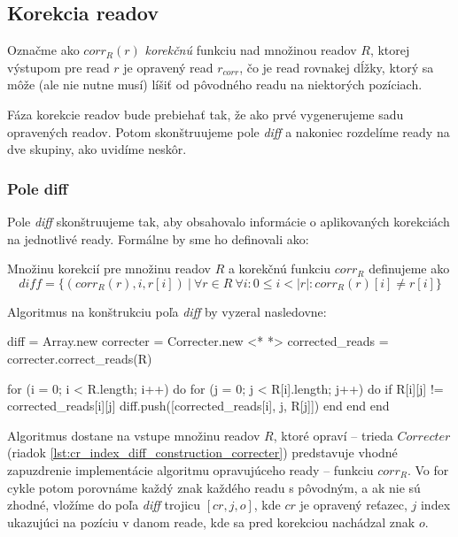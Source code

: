 \subsection{Korekcia readov}
\begin{ozn}
Označme ako $corr_R(r)$ \emph{korekčnú} funkciu nad množinou readov $R$, ktorej výstupom pre read $r$ je opravený read $r_{corr}$, čo je read rovnakej dĺžky, ktorý sa môže (ale nie nutne musí) líšiť od pôvodného readu na niektorých pozíciach.
\end{ozn}

Fáza korekcie readov bude prebiehať tak, že ako prvé vygenerujeme sadu opravených readov. Potom skonštruujeme pole \emph{diff} a nakoniec rozdelíme ready na dve skupiny, ako uvidíme neskôr.

\subsubsection{Pole diff}
Pole \emph{diff} skonštruujeme tak, aby obsahovalo informácie o aplikovaných korekciách na jednotlivé ready. Formálne by sme ho definovali ako:

\begin{defn}
Množinu korekcií pre množinu readov $R$ a korekčnú funkciu $corr_R$ definujeme ako 
$$
diff = \{(corr_R(r), i, r[i])~|~\forall r \in R~\forall i : 0 \leq i < |r| : corr_R(r)[i] \neq r[i] \}
$$
\end{defn}

Algoritmus na konštrukciu poľa \emph{diff} by vyzeral nasledovne:

\bigskip
\begin{pseudocode}[label=lst:cr_index_diff_construction,caption={Algoritmus konštrukcie poľa diff.}]
diff = Array.new
correcter = Correcter.new <* \label{lst:cr_index_diff_construction_correcter} *>
corrected_reads = correcter.correct_reads(R)

for (i = 0; i < R.length; i++) do
  for (j = 0; j < R[i].length; j++) do
    if R[i][j] != corrected_reads[i][j]
      diff.push([corrected_reads[i], j, R[j]])
    end  
  end
end
\end{pseudocode}
\bigskip

Algoritmus dostane na vstupe množinu readov $R$, ktoré opraví -- trieda $Correcter$ (riadok \ref{lst:cr_index_diff_construction_correcter}) predstavuje vhodné zapuzdrenie implementácie algoritmu opravujúceho ready -- funkciu $corr_R$. Vo for cykle potom porovnáme každý znak každého readu s pôvodným, a ak nie sú zhodné, vložíme do poľa \emph{diff} trojicu $[cr, j, o]$, kde $cr$ je opravený reťazec, $j$ index ukazujúci na pozíciu v danom reade, kde sa pred korekciou nachádzal znak $o$.

